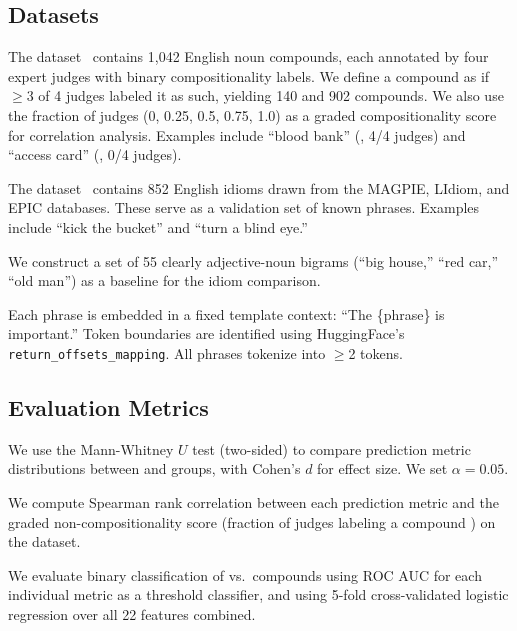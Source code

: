 \subsection{Datasets}
\label{sec:datasets}

The \farahmand dataset~\citep{farahmand2015multiword} contains 1,042 English noun compounds, each annotated by four expert judges with binary compositionality labels.
We define a compound as \noncomp if $\geq$3 of 4 judges labeled it as such, yielding 140 \noncomp and 902 \comp compounds.
We also use the fraction of judges (0, 0.25, 0.5, 0.75, 1.0) as a graded compositionality score for correlation analysis.
Examples include ``blood bank'' (\noncomp, 4/4 judges) and ``access card'' (\comp, 0/4 judges).

The \idiomem dataset~\citep{haviv2022understanding} contains 852 English idioms drawn from the MAGPIE, LIdiom, and EPIC databases.
These serve as a validation set of known \noncomp phrases.
Examples include ``kick the bucket'' and ``turn a blind eye.''

We construct a set of 55 clearly \comp adjective-noun bigrams (\eg ``big house,'' ``red car,'' ``old man'') as a baseline for the idiom comparison.

Each phrase is embedded in a fixed template context: ``The \{phrase\} is important.''
Token boundaries are identified using HuggingFace's \texttt{return\_offsets\_mapping}.
All phrases tokenize into $\geq$2 tokens.

\subsection{Evaluation Metrics}

We use the Mann-Whitney $U$ test (two-sided) to compare prediction metric distributions between \noncomp and \comp groups, with Cohen's $d$ for effect size.
We set $\alpha = 0.05$.

We compute Spearman rank correlation between each prediction metric and the graded non-compositionality score (fraction of judges labeling a compound \noncomp) on the \farahmand dataset.

We evaluate binary classification of \noncomp vs.\ \comp compounds using ROC AUC for each individual metric as a threshold classifier, and using 5-fold cross-validated logistic regression over all 22 features combined.
